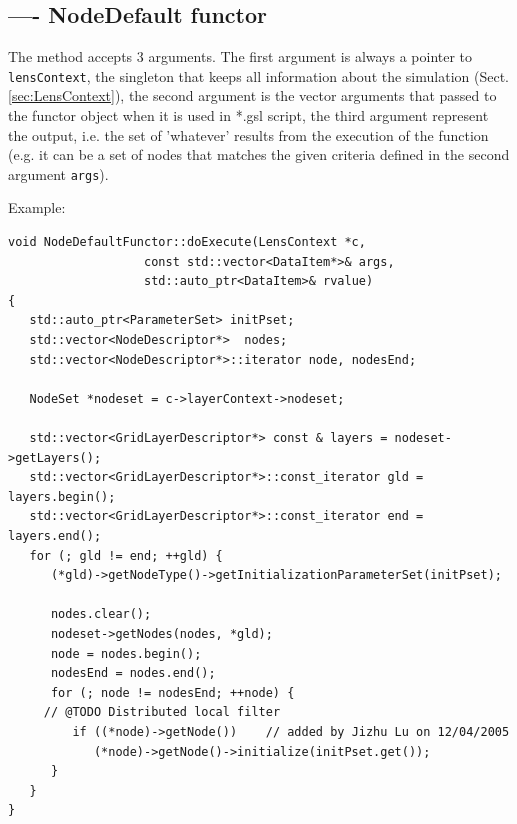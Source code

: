 \subsection{---- NodeDefault functor}
\label{sec:functor-doExecute()}	
\label{sec:doExecute}
\label{sec:NodeDefaultFunctor}
\label{sec:NodeDefaultFunctor-doExecute()}

The method accepts 3 arguments. The first argument is always a pointer to
\verb!lensContext!, the singleton that keeps all information about the
simulation (Sect.\ref{sec:LensContext}), the second argument is the vector
arguments that passed to the functor object when it is used in *.gsl script,
the third argument represent the output, i.e. the set of 'whatever' results
from the execution of the function (e.g. it can be a set of nodes that matches
the given criteria defined in the second argument \verb!args!).

Example:
\begin{verbatim}
void NodeDefaultFunctor::doExecute(LensContext *c, 
				   const std::vector<DataItem*>& args, 
				   std::auto_ptr<DataItem>& rvalue)
{
   std::auto_ptr<ParameterSet> initPset;
   std::vector<NodeDescriptor*>  nodes;
   std::vector<NodeDescriptor*>::iterator node, nodesEnd;

   NodeSet *nodeset = c->layerContext->nodeset;
   
   std::vector<GridLayerDescriptor*> const & layers = nodeset->getLayers();
   std::vector<GridLayerDescriptor*>::const_iterator gld = layers.begin();
   std::vector<GridLayerDescriptor*>::const_iterator end = layers.end();
   for (; gld != end; ++gld) {
      (*gld)->getNodeType()->getInitializationParameterSet(initPset);

      nodes.clear();
      nodeset->getNodes(nodes, *gld);
      node = nodes.begin();
      nodesEnd = nodes.end();
      for (; node != nodesEnd; ++node) {
	 // @TODO Distributed local filter
         if ((*node)->getNode())    // added by Jizhu Lu on 12/04/2005
            (*node)->getNode()->initialize(initPset.get());
      }
   }
}
\end{verbatim}








